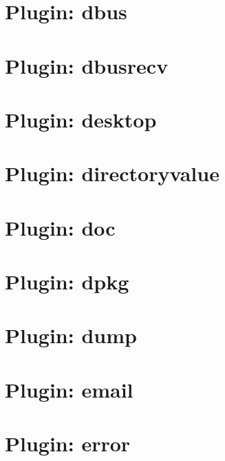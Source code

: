 \let\mypdfximage\pdfximage\def\pdfximage{\immediate\mypdfximage}\documentclass[twoside]{book}
\newcommand{\+}{\discretionary{\mbox{\scriptsize$\hookleftarrow$}}{}{}}
\begin{document}
\chapter{Plugin\+: dbus}
\label{md_src_plugins_dbus_README}

\chapter{Plugin\+: dbusrecv}
\label{md_src_plugins_dbusrecv_README}

\chapter{Plugin\+: desktop}
\label{md_src_plugins_desktop_README}

\chapter{Plugin\+: directoryvalue}
\label{md_src_plugins_directoryvalue_README}

\chapter{Plugin\+: doc}
\label{md_src_plugins_doc_README}

\chapter{Plugin\+: dpkg}
\label{md_src_plugins_dpkg_README}

\chapter{Plugin\+: dump}
\label{md_src_plugins_dump_README}

\chapter{Plugin\+: email}
\label{md_src_plugins_email_README}

\chapter{Plugin\+: error}
\label{md_src_plugins_error_README}

\end{document}
